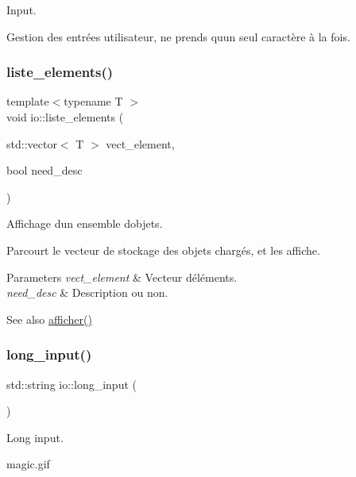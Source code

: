 Input. 

Gestion des entrées utilisateur, ne prends qu\textquotesingle{}un seul caractère à la fois. \mbox{\label{namespaceio_a0518bc32f1debefc2630431cd0c22cb0}} 
\subsubsection{\texorpdfstring{liste\+\_\+elements()}{liste\_elements()}}
{\footnotesize\ttfamily template$<$typename T $>$ \\
void io\+::liste\+\_\+elements (\begin{DoxyParamCaption}\item[{std\+::vector$<$ T $>$}]{vect\+\_\+element,  }\item[{bool}]{need\+\_\+desc }\end{DoxyParamCaption})}



Affichage d\textquotesingle{}un ensemble d\textquotesingle{}objets. 

Parcourt le vecteur de stockage des objets chargés, et les affiche. 
\begin{DoxyParams}{Parameters}
{\em vect\+\_\+element} & Vecteur d\textquotesingle{}éléments. \\
\hline
{\em need\+\_\+desc} & Description ou non. \\
\hline
\end{DoxyParams}
\begin{DoxySeeAlso}{See also}
\hyperlink{namespaceio_a0e3593d732c42572e8b3cb09ad21c4c9}{afficher()} 
\end{DoxySeeAlso}
\mbox{\label{namespaceio_ab044be3afd7ac04eeb1a496af0f1d5c6}} 
\subsubsection{\texorpdfstring{long\+\_\+input()}{long\_input()}}
{\footnotesize\ttfamily std\+::string io\+::long\+\_\+input (\begin{DoxyParamCaption}{ }\end{DoxyParamCaption})}



Long input. 

magic.\+gif 